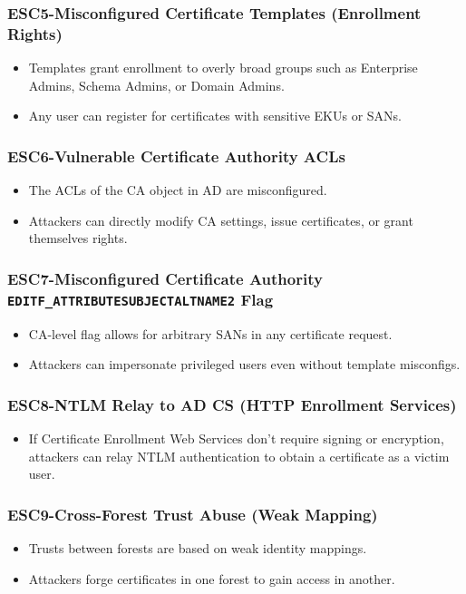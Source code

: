 {\begin{itemiz3
021e}
\subsubsection{ESC5-Misconfigured Certificate Templates (Enrollment Rights)}
\begin{itemize}
    \item Templates grant enrollment to overly broad groups such as Enterprise Admins, Schema Admins, or Domain Admins.
    \item Any user can register for certificates with sensitive EKUs or SANs.
\end{itemize}

\subsubsection{ESC6-Vulnerable Certificate Authority ACLs}
\begin{itemize}
    \item The ACLs of the CA object in AD are misconfigured.
    \item Attackers can directly modify CA settings, issue certificates, or grant themselves rights.
\end{itemize}

\subsubsection{ESC7-Misconfigured Certificate Authority \texttt{EDITF\_ATTRIBUTESUBJECTALTNAME2} Flag}
\begin{itemize}
    \item CA-level flag allows for arbitrary SANs in any certificate request.
    \item Attackers can impersonate privileged users even without template misconfigs.
\end{itemize}

\subsubsection{ESC8-NTLM Relay to AD CS (HTTP Enrollment Services)}
\begin{itemize}
    \item If Certificate Enrollment Web Services don't require signing or encryption, attackers can relay NTLM authentication to obtain a certificate as a victim user.
\end{itemize}

\subsubsection{ESC9-Cross-Forest Trust Abuse (Weak Mapping)}
\begin{itemize}
    \item Trusts between forests are based on weak identity mappings.
    \item Attackers forge certificates in one forest to gain access in another.
\end{itemize}


\end{itemiz3
021e}}
